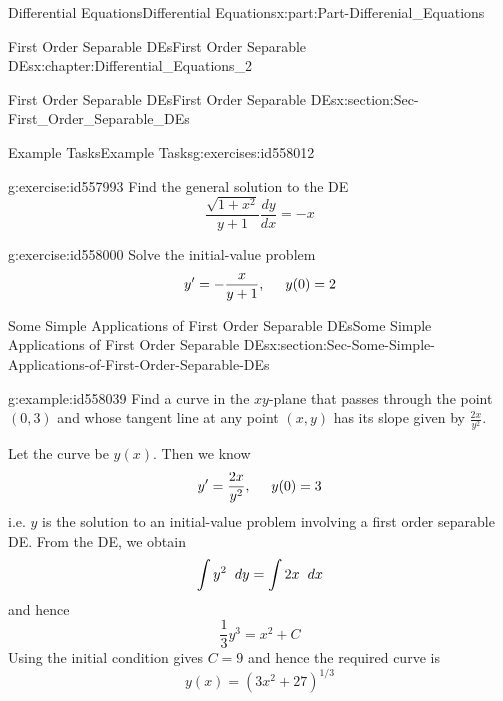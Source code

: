 \documentclass[oneside,10pt,]{book}
\numberwithin{equation}{section}
\begin{document}
\begin{partptx}{Differential Equations}{}{Differential Equations}{}{}{x:part:Part-Differenial_Equations}
\begin{chapterptx}{First Order Separable DEs}{}{First Order Separable DEs}{}{}{x:chapter:Differential_Equations_2}
\begin{sectionptx}{First Order Separable DEs}{}{First Order Separable DEs}{}{}{x:section:Sec-First_Order_Separable_DEs}
\begin{exercises-subsection-numberless}{Example Tasks}{}{Example Tasks}{}{}{g:exercises:id558012}
\begin{divisionexercise}{1}{}{}{g:exercise:id557993}%
Find the general solution to the DE%
\begin{equation*}
\frac{\sqrt{1+x^2}}{y+1}\frac{dy}{dx}=-x
\end{equation*}
%
\end{divisionexercise}%
\begin{divisionexercise}{2}{}{}{g:exercise:id558000}%
Solve the initial-value problem%
\begin{equation*}
y'=-\frac{x}{y+1}, \hspace{5mm} y(0)=2
\end{equation*}
%
\end{divisionexercise}%
\end{exercises-subsection-numberless}
\end{sectionptx}
%
%
\typeout{************************************************}
\typeout{************************************************}
%
\begin{sectionptx}{Some Simple Applications of First Order Separable DEs}{}{Some Simple Applications of First Order Separable DEs}{}{}{x:section:Sec-Some-Simple-Applications-of-First-Order-Separable-DEs}
\begin{example}{}{g:example:id558039}%
Find a curve in the \(xy\)-plane that passes through the point \((0,3)\) and whose tangent line at any point \((x,y)\) has its slope given by \(\frac{2x}{y^2}\).%
\par\smallskip%
\noindent\hypertarget{g:solution:id558017}{}Let the curve be \(y(x)\). Then we know%
\begin{equation*}
y'=\frac{2x}{y^2}, \hspace{5mm} y(0)=3
\end{equation*}
i.e. \(y\) is the solution to an initial-value problem involving a first order separable DE. From the DE, we obtain%
\begin{equation*}
\int y^2 \hspace{2mm}dy=\int 2x\hspace{2mm}dx
\end{equation*}
and hence%
\begin{equation*}
\frac{1}{3}y^3=x^2+C
\end{equation*}
Using the initial condition gives \(C=9\) and hence the required curve is%
\begin{equation*}
y(x)=(3x^2+27)^{1/3}
\end{equation*}

\end{example}
\end{sectionptx}
\end{chapterptx}
\end{partptx}
\end{document}
